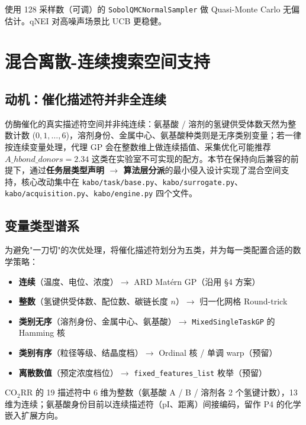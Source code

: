 \documentclass[12pt,a4paper]{article}
\begin{document}
使用 128 采样数（可调）的 \texttt{SobolQMCNormalSampler} 做 Quasi-Monte Carlo 无偏估计\cite{botorch2019}。qNEI 对高噪声场景比 UCB 更稳健。


\section{混合离散-连续搜索空间支持}
\label{sec:mixed-space}

\subsection{动机：催化描述符并非全连续}

仿酶催化的真实描述符空间并非纯连续：氨基酸 / 溶剂的氢键供受体数天然为整数计数 ($0, 1, \ldots, 6$)，溶剂身份、金属中心、氨基酸种类则是无序类别变量；若一律按连续变量处理，代理 GP 会在整数维上做连续插值、采集优化可能推荐 $A\_{hbond\_donors} = 2.34$ 这类在实验室不可实现的配方\cite{garrido2020round}。本节在保持向后兼容的前提下，通过\textbf{任务层类型声明 $\rightarrow$ 算法层分派}的最小侵入设计实现了混合空间支持，核心改动集中在 \texttt{kabo/task/base.py}、\texttt{kabo/surrogate.py}、\texttt{kabo/acquisition.py}、\texttt{kabo/engine.py} 四个文件。

\subsection{变量类型谱系}

为避免"一刀切"的次优处理，将催化描述符划分为五类，并为每一类配置合适的数学策略：

\begin{itemize}
    \item \textbf{连续}（温度、电位、浓度）$\to$ ARD Mat\'{e}rn GP（沿用 §4 方案）
    \item \textbf{整数}（氢键供受体数、配位数、碳链长度 $n$）$\to$ 归一化网格 Round-trick
    \item \textbf{类别无序}（溶剂身份、金属中心、氨基酸）$\to$ \texttt{MixedSingleTaskGP} 的 Hamming 核\cite{ru2020cocabo}
    \item \textbf{类别有序}（粒径等级、结晶度档）$\to$ Ordinal 核 / 单调 warp（预留）
    \item \textbf{离散数值}（预定浓度档位）$\to$ \texttt{fixed\_features\_list} 枚举（预留）
\end{itemize}

CO$_2$RR 的 19 描述符中 6 维为整数（氨基酸 A / B / 溶剂各 2 个氢键计数），13 维为连续；氨基酸身份目前以连续描述符（pI、距离）间接编码，留作 P4 的化学嵌入扩展方向。
\end{document}
